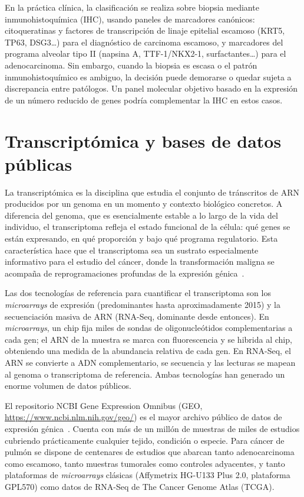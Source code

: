 En la práctica clínica, la clasificación se realiza sobre biopsia mediante
inmunohistoquímica (IHC), usando paneles de marcadores canónicos:
citoqueratinas y factores de transcripción de linaje epitelial escamoso
(KRT5, TP63, DSG3\ldots) para el diagnóstico de carcinoma escamoso, y
marcadores del programa alveolar tipo II (napsina A, TTF-1/NKX2-1,
surfactantes\ldots) para el adenocarcinoma. Sin embargo, cuando la biopsia
es escasa o el patrón inmunohistoquímico es ambiguo, la decisión puede
demorarse o quedar sujeta a discrepancia entre patólogos. Un panel
molecular objetivo basado en la expresión de un número reducido de genes
podría complementar la IHC en estos casos.

\section{Transcriptómica y bases de datos públicas}
\label{sec:transcriptomica}

La transcriptómica es la disciplina que estudia el conjunto de tránscritos
de ARN producidos por un genoma en un momento y contexto biológico
concretos. A diferencia del genoma, que es esencialmente estable a lo largo
de la vida del individuo, el transcriptoma refleja el estado funcional de
la célula: qué genes se están expresando, en qué proporción y bajo qué
programa regulatorio. Esta característica hace que el transcriptoma sea un
sustrato especialmente informativo para el estudio del cáncer, donde la
transformación maligna se acompaña de reprogramaciones profundas de la
expresión génica~\cite{hanahan2011hallmarks}.

Las dos tecnologías de referencia para cuantificar el transcriptoma son los
\emph{microarrays} de expresión (predominantes hasta aproximadamente
2015) y la secuenciación masiva de ARN (RNA-Seq, dominante desde entonces).
En \emph{microarrays}, un chip fija miles de sondas de oligonucleótidos
complementarias a cada gen; el ARN de la muestra se marca con
fluorescencia y se hibrida al chip, obteniendo una medida de la abundancia
relativa de cada gen. En RNA-Seq, el ARN se convierte a ADN complementario,
se secuencia y las lecturas se mapean al genoma o transcriptoma de
referencia. Ambas tecnologías han generado un enorme volumen de datos
públicos.

El repositorio NCBI Gene Expression Omnibus (GEO,
\url{https://www.ncbi.nlm.nih.gov/geo/}) es el mayor archivo público de
datos de expresión génica~\cite{barrett2013geo}. Cuenta con más de un
millón de muestras de miles de estudios cubriendo prácticamente cualquier
tejido, condición o especie. Para cáncer de pulmón se dispone de centenares
de estudios que abarcan tanto adenocarcinoma como escamoso, tanto muestras
tumorales como controles adyacentes, y tanto plataformas de
\emph{microarrays} clásicas (Affymetrix HG-U133 Plus 2.0, plataforma GPL570)
como datos de RNA-Seq de The Cancer Genome Atlas (TCGA).

